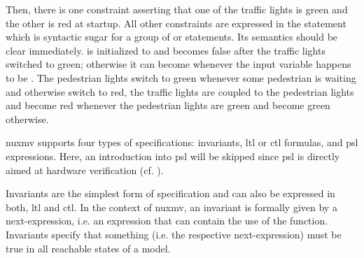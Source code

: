 \begin{example}
    Then, there is one  constraint asserting that one of the traffic lights is green and the other is red at startup.
    All other constraints are expressed in the  statement which is syntactic sugar for a group of  or  statements.
    Its semantics should be clear immediately.
     is initialized to  and becomes false after the traffic lights switched to green; otherwise it can become  whenever the input variable  happens to be .
    The pedestrian lights switch to green whenever some pedestrian is waiting and otherwise switch to red, the traffic lights are coupled to the pedestrian lights and become red whenever the pedestrian lights are green and become green otherwise.
\end{example}

\gls{nuxmv} supports four types of specifications: invariants, \gls{ltl} or \gls{ctl} formulas, and \gls{psl} expressions.
Here, an introduction into \gls{psl} will be skipped since \gls{psl} is directly aimed at hardware verification (cf. \cite{Foster05}).

Invariants are the simplest form of specification and can also be expressed in both, \gls{ltl} and \gls{ctl}.
In the context of \gls{nuxmv}, an invariant is formally given by a next-expression, i.e. an expression that can contain the use of the  function.
Invariants specify that something (i.e. the respective next-expression) must be true in all reachable states of a model.

